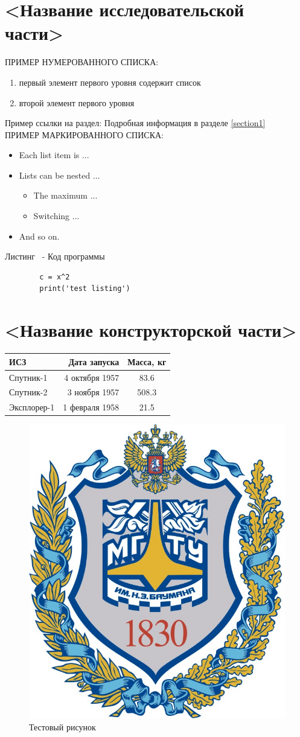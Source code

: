 \documentclass[utf8x, 14pt, oneside, a4paper]{article}
\begin{document}
		\pagebreak

	\section{<Название исследовательской части>}
	ПРИМЕР НУМЕРОВАННОГО СПИСКА:
	\begin{enumerate} 
  		\item первый элемент первого уровня содержит список 
		\item  второй элемент первого уровня
	\end{enumerate}
	Пример ссылки на раздел: Подробная информация в разделе \ref{section1}
	\\ ПРИМЕР МАРКИРОВАННОГО СПИСКА:
	\begin{itemize}
		\item Each list item is ...
		\item Lists can be nested ...
			\begin{itemize}
				\item The maximum ...
				\item Switching ...
			\end{itemize}
		\item And so on.
	\end{itemize}
	
	Листинг \thenumberlisting \ - Код программы
	\begin{lstlisting}
		c = x^2
		print('test listing')
	\end{lstlisting}
		\pagebreak

	\section{<Название конструкторской части>}
	\begin{tabular}{ | p{100pt} | r | c | }
		\hline
		ИСЗ & Дата запуска & Масса, кг  \\ \hline
		Спутник-1 & 4 октября 1957 & 83.6 \\
		Спутник-2 & 3 ноября 1957 & 508.3 \\
		Эксплорер-1 & 1 февраля 1958 & 21.5 \\
		\hline
	\end{tabular}

	\begin{figure}[h]
		\centering
		\includegraphics[width=0.5\linewidth]{1.png}
		\caption{Тестовый рисунок}
		\label{fig:mpr}
	\end{figure}
	
\end{document}
